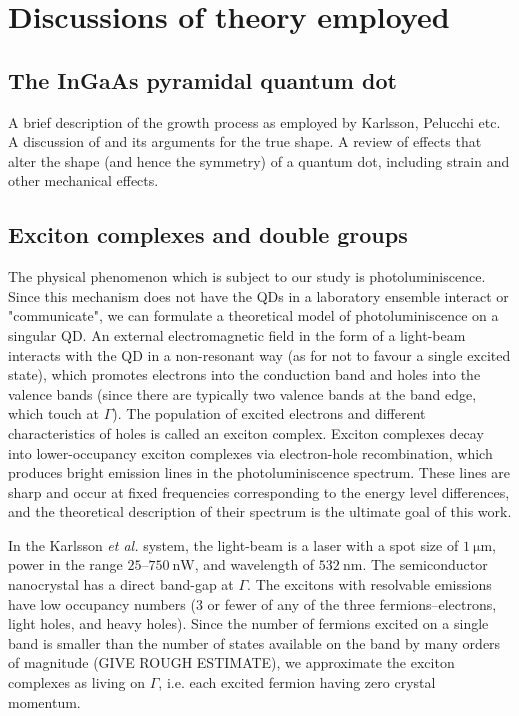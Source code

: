 \section{Discussions of theory employed}

\subsection{The InGaAs pyramidal quantum dot} \label{sec:growth}
A brief description of the growth process as employed by Karlsson, Pelucchi etc. A discussion of \cite{hexagon} and its arguments for the true shape. A review of effects that alter the shape (and hence the symmetry) of a quantum dot, including strain and other mechanical effects.

\subsection{Exciton complexes and double groups} \label{sec:exciton_theory}
The physical phenomenon which is subject to our study is photoluminiscence. Since this mechanism does not have the QDs in a laboratory ensemble interact or "communicate", we can formulate a theoretical model of photoluminiscence on a singular QD. An external electromagnetic field in the form of a light-beam interacts with the QD in a non-resonant way (as for not to favour a single excited state), which promotes electrons into the conduction band and holes into the valence bands (since there are typically two valence bands at the band edge, which touch at $\Gamma$). The population of excited electrons and different characteristics of holes is called an exciton complex. Exciton complexes decay into lower-occupancy exciton complexes via electron-hole recombination, which produces bright emission lines in the photoluminiscence spectrum. These lines are sharp and occur at fixed frequencies corresponding to the energy level differences, and the theoretical description of their spectrum is the ultimate goal of this work.

In the Karlsson \textit{et al.} system, the light-beam is a laser with a spot size of $\SI{1}{\micro\metre}$, power in the range $25$--$\SI{750}{\nano\watt}$, and wavelength of $\SI{532}{\nano\metre}$. The semiconductor nanocrystal has a direct band-gap at $\Gamma$. The excitons with resolvable emissions have low occupancy numbers (3 or fewer of any of the three fermions--electrons, light holes, and heavy holes). Since the number of fermions excited on a single band is smaller than the number of states available on the band by many orders of magnitude (GIVE ROUGH ESTIMATE), we approximate the exciton complexes as living on $\Gamma$, i.e. each excited fermion having zero crystal momentum.


